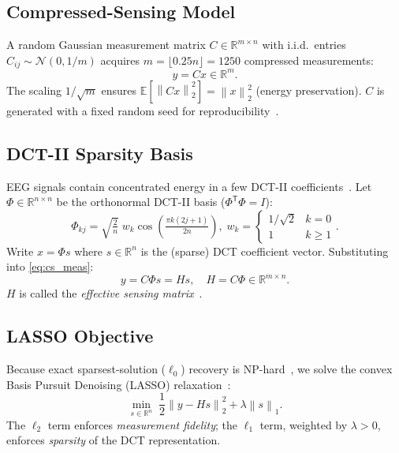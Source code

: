 \documentclass[journal,twoside,10pt]{IEEEtran}
\newcommand{\norm}[1]{\left\lVert#1\right\rVert}
\newcommand{\R}{\mathbb{R}}
\newcommand{\T}{^{\mathsf{T}}}
\begin{document}
\subsection{Compressed-Sensing Model}
\label{ssec:cs_model}

A random Gaussian measurement matrix $C\in\R^{m\times n}$ with i.i.d.\ entries
$C_{ij}\sim\mathcal{N}(0,1/m)$ acquires $m=\lfloor 0.25n\rfloor=1250$ compressed measurements:
\begin{equation}
  y = Cx \in \R^m.
  \label{eq:cs_meas}
\end{equation}
The scaling $1/\sqrt{m}$ ensures $\mathbb{E}[\norm{Cx}_2^2]=\norm{x}_2^2$ (energy preservation).
$C$ is generated with a fixed random seed for reproducibility~\cite{donoho2006,candes2006}.

\subsection{DCT-II Sparsity Basis}
\label{ssec:dct}

EEG signals contain concentrated energy in a few DCT-II coefficients~\cite{gurve2020,alsenwi2018}.  Let
$\Phi\in\R^{n\times n}$ be the orthonormal DCT-II basis ($\Phi\T\Phi=I$):
\begin{equation}
  \Phi_{kj}=\sqrt{\tfrac{2}{n}}\;w_k\cos\!\left(\tfrac{\pi k(2j+1)}{2n}\right),\;
  w_k=\begin{cases}1/\!\sqrt{2}&k=0\\1&k\ge1\end{cases}.
\end{equation}
Write $x=\Phi s$ where $s\in\R^n$ is the (sparse) DCT coefficient vector.  Substituting into
\eqref{eq:cs_meas}:
\begin{equation}
  y = C\Phi s = Hs, \quad H=C\Phi\in\R^{m\times n}.
  \label{eq:sensing}
\end{equation}
$H$ is called the \emph{effective sensing matrix}~\cite{abdulghani2012}.

\subsection{LASSO Objective}
\label{ssec:lasso}

Because exact sparsest-solution ($\ell_0$) recovery is NP-hard~\cite{donoho2006}, we solve the convex
Basis Pursuit Denoising (LASSO) relaxation~\cite{tibshirani1996,chen1999}:
\begin{equation}
  \min_{s\in\R^n}\;\frac{1}{2}\norm{y-Hs}_2^2 + \lambda\norm{s}_1.
  \label{eq:lasso}
\end{equation}
The $\ell_2$ term enforces \emph{measurement fidelity}; the $\ell_1$ term, weighted by $\lambda>0$,
enforces \emph{sparsity} of the DCT representation.
\end{document}
